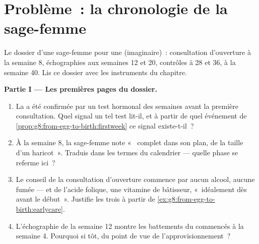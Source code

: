 \section{Problème~: la chronologie de la sage-femme}

\begin{problem}\label{pb:g8:from-egg-to-birth:1}
Le dossier d'une sage-femme pour une  (imaginaire)~:
consultation d'ouverture à la semaine 8, échographies aux semaines
12 et 20, contrôles à 28 et 36,  à la semaine 40. Lis ce
dossier avec les instruments du chapitre.

\medskip\noindent\textbf{Partie I --- Les premières pages du
dossier.}
\begin{enumerate}
  \item La  a été confirmée par un test hormonal des
        semaines avant la première consultation. Quel signal un tel
        test lit-il, et à partir de quel événement de
        \cref{prop:g8:from-egg-to-birth:firstweek} ce signal
        existe-t-il~?
  \item À la semaine 8, la sage-femme note «~ complet dans
        son plan, de la taille d'un haricot~». Traduis dans les
        termes du calendrier --- quelle phase se referme ici~?
  \item Le conseil de la consultation d'ouverture commence par
        aucun alcool, aucune fumée --- et de l'acide folique, une
        vitamine de bâtisseur, «~idéalement dès avant le début~».
        Justifie les trois à partir de
        \cref{ex:g8:from-egg-to-birth:earlycare}.
  \item L'échographie de la semaine 12 montre les battements du
         commencés à la semaine 4. Pourquoi si tôt, du point de
        vue de l'approvisionnement~?
\end{enumerate}


\end{problem}
